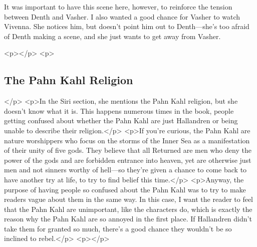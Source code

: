 It was important to have this scene here, however, to reinforce the tension between Denth and Vasher. I also wanted a good chance for Vasher to watch Vivenna. She notices him, but doesn’t point him out to Denth—she’s too afraid of Denth making a scene, and she just wants to get away from Vasher.



<p></p>
<p>\subsection*{The Pahn Kahl Religion}</p>
<p>In the Siri section, she mentions the Pahn Kahl religion, but she doesn’t know what it is. This happens numerous times in the book, people getting confused about whether the Pahn Kahl are just Hallandren or being unable to describe their religion.</p>
<p>If you’re curious, the Pahn Kahl are nature worshippers who focus on the storms of the Inner Sea as a manifestation of their unity of five gods. They believe that all Returned are men who deny the power of the gods and are forbidden entrance into heaven, yet are otherwise just men and not sinners worthy of hell—so they’re given a chance to come back to have another try at life, to try to find belief this time.</p>
<p>Anyway, the purpose of having people so confused about the Pahn Kahl was to try to make readers vague about them in the same way. In this case, I want the reader to feel that the Pahn Kahl are unimportant, like the characters do, which is exactly the reason why the Pahn Kahl are so annoyed in the first place. If Hallandren didn’t take them for granted so much, there’s a good chance they wouldn’t be so inclined to rebel.</p>
<p></p>



